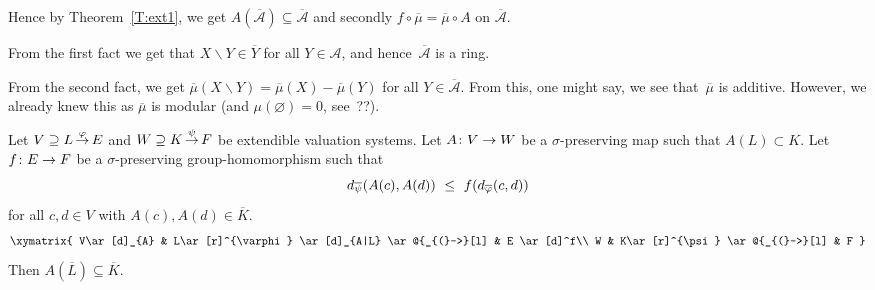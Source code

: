 \documentclass[main.tex]{subfiles}
\begin{document}
\begin{ex}
Hence by Theorem~\ref{T:ext1},
we get $A(\overline{\mathcal{A}})\subseteq \overline{\mathcal{A}}$
and secondly
  $f\circ\overline\mu=\overline \mu \circ A$ on $\overline{\mathcal{A}}$.

From the first fact
we get that $X\backslash Y \in \overline{Y}$
for all $Y\in \mathcal{A}$,
and hence~$\overline{\mathcal{A}}$ is a ring.

From the second fact,
we get $\overline\mu (X\backslash Y)
= \overline\mu(X) - \overline\mu(Y)$
for all $Y\in \overline{\mathcal{A}}$.
From this,
one might say,
we see that~$\overline\mu$ is additive.
However, we already knew this
as $\overline\mu$ is modular
(and $\mu(\varnothing)=0$, see~??).
\end{ex}
%
%
\begin{thm}
\label{T:ext2}
Let $V \supseteq L\,\smash{\stackrel{\varphi}{\rightarrow}}\,E$ and
 $W \supseteq K\,\smash{\stackrel{\psi}{\rightarrow}}\,F$ be extendible valuation systems.
Let
$A\colon V\rightarrow W$
be a $\sigma$-preserving map
such that $A(L)\subset K$.
Let $f\colon E\rightarrow F$ be a $\sigma$-preserving group-homomorphism
such that
\begin{equation}
\label{eq:T:ext2-as}
\ld{\overline{\psi}}(A(c),A(d))\ \leq\  f(\ld{\overline{\varphi}}(c,d))
\end{equation}
for all $c,d\in V$ with $A(c),A(d)\in \overline K$.
\begin{equation*}
\xymatrix{
V\ar[d]_{A} & 
  L\ar[r]^{\varphi} \ar[d]_{A|L} \ar @{_{(}->}[l] & 
  E \ar[d]^f\\
W &
  K\ar[r]^{\psi} \ar @{_{(}->}[l] & 
  F
}\end{equation*}
Then $A(\overline{L})\subseteq \overline{K}$.
\end{thm}
\end{document}
